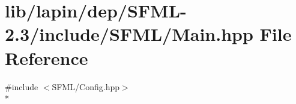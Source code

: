 \hypertarget{lapin_2dep_2_s_f_m_l-2_83_2include_2_s_f_m_l_2_main_8hpp}{\section{lib/lapin/dep/\-S\-F\-M\-L-\/2.3/include/\-S\-F\-M\-L/\-Main.hpp File Reference}
\label{lapin_2dep_2_s_f_m_l-2_83_2include_2_s_f_m_l_2_main_8hpp}
}
{\ttfamily \#include $<$S\-F\-M\-L/\-Config.\-hpp$>$}\\*
